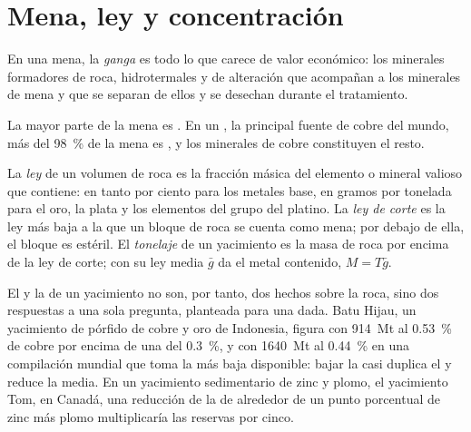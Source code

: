 \section{Mena, ley y concentración}\label{sec:b2:ore-deposits:grade}

\begin{definition}[Ganga]\label{def:b2:ore-deposits:ore}
En una mena, la \emph{ganga} es todo lo que carece de valor económico: los
minerales formadores de roca, hidrotermales y de alteración que acompañan a los minerales de mena y que se
separan de ellos y se desechan durante el tratamiento.
\end{definition}

La mayor parte de la mena es . En un , la principal fuente de cobre del mundo, más del
\qty{98}{\percent} de la mena es , y los minerales de cobre constituyen el resto.

\begin{definition}\label{def:b2:ore-deposits:grade}
La \emph{ley} de un volumen de roca es la fracción másica del elemento
o mineral valioso que contiene: en tanto por ciento para los metales base, en gramos por tonelada para el oro, la plata y los
elementos del grupo del platino. La \emph{ley de corte} es la ley más baja a la
que un bloque de roca se cuenta como mena; por debajo de ella, el bloque es estéril. El
\emph{tonelaje} de un yacimiento es la masa de roca por encima de la ley de corte; con su
ley media $\bar g$ da el metal contenido, $M = T\bar g$.
\end{definition}

El  y la  de un yacimiento no son, por tanto, dos hechos sobre la roca, sino dos
respuestas a una sola pregunta, planteada para una  dada. Batu Hijau, un yacimiento de pórfido de cobre y oro de
Indonesia, figura con \qty{914}{Mt} al \qty{0.53}{\percent} de cobre por encima de una  del
\qty{0.3}{\percent}, y con \qty{1640}{Mt} al \qty{0.44}{\percent} en una compilación mundial
que toma la  más baja disponible: bajar la  casi duplica el  y
reduce la  media. En un yacimiento sedimentario de zinc y plomo, el yacimiento Tom, en Canadá, una reducción
de la  de alrededor de un punto porcentual de zinc más plomo multiplicaría las reservas por cinco.

